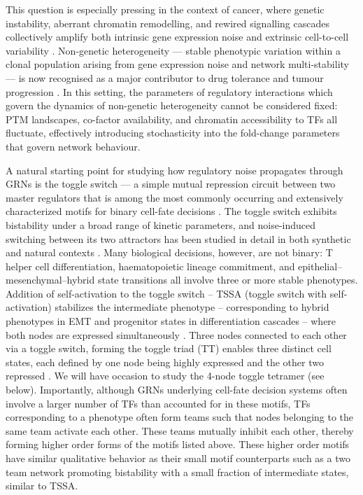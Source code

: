 \documentclass[11pt]{article}
\begin{document}
This question is especially pressing in the context of cancer, where genetic instability, aberrant chromatin remodelling, and rewired signalling cascades collectively amplify both intrinsic gene expression noise and extrinsic cell-to-cell variability \cite{Brock2009Non-geneticTumours, Landau2014LocallyLeukemia, Hanahan2026HallmarksBeyond}. Non-genetic heterogeneity — stable phenotypic variation within a clonal population arising from gene expression noise and network multi-stability — is now recognised as a major contributor to drug tolerance and tumour progression \cite{Hanahan2026HallmarksBeyond, Franca2024CellularContinuum, Shaffer2017RareResistance}. In this setting, the parameters of regulatory interactions which govern the dynamics of non-genetic heterogeneity cannot be considered fixed: PTM landscapes, co-factor availability, and chromatin accessibility to TFs all fluctuate, effectively introducing stochasticity into the fold-change parameters that govern network behaviour. 


A natural starting point for studying how regulatory noise propagates through GRNs is the toggle switch — a simple mutual repression circuit between two master regulators that is among the most commonly occurring and extensively characterized motifs for binary cell-fate decisions \cite{gardner2000construction}. The toggle switch exhibits bistability under a broad range of kinetic parameters, and noise-induced switching between its two attractors has been studied in detail in both synthetic and natural contexts \cite{tian2006stochastic}. Many biological decisions, however, are not binary: T helper cell differentiation, haematopoietic lineage commitment, and epithelial–mesenchymal–hybrid state transitions all involve three or more stable phenotypes. Addition of self-activation to the toggle switch – TSSA (toggle switch with self-activation) stabilizes the intermediate phenotype – corresponding to hybrid phenotypes in EMT and progenitor states in differentiation cascades – where both nodes are expressed simultaneously \cite{Lu2013}. Three nodes connected to each other via a toggle switch, forming the toggle triad (TT) enables three distinct cell states, each defined by one node being highly expressed and the other two repressed \cite{doi:10.1098/rsif.2020.0631}. We will have occasion to study the 4-node toggle tetramer (see below). Importantly, although GRNs underlying cell-fate decision systems often involve a larger number of TFs than accounted for in these motifs, TFs corresponding to a phenotype often form teams such that nodes belonging to the same team activate each other. These teams mutually inhibit each other, thereby forming higher order forms of the motifs listed above. These higher order motifs have similar qualitative behavior as their small motif counterparts such as a two team network promoting bistability with a small fraction of intermediate states, similar to TSSA. 
\end{document}
